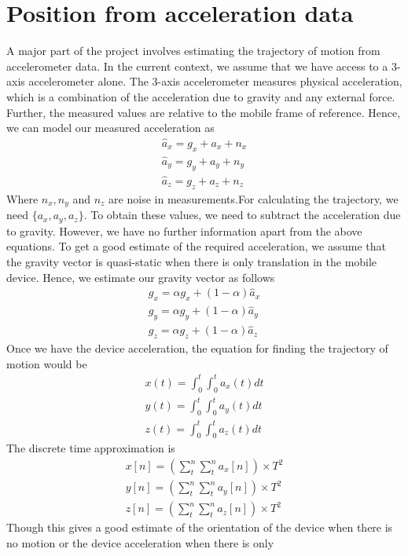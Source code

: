 \documentclass[BTech]{iitmdiss}
\begin{document}
\section{Position from acceleration data}
\label{basic_theory:accel}
A major part of the project involves estimating the trajectory of motion
from accelerometer data. In the current context, we assume that we have
access to a 3-axis accelerometer alone. The 3-axis accelerometer 
measures physical acceleration, which is a combination of the 
acceleration due to gravity and any external force. Further, the 
measured values are relative to the mobile frame of reference. Hence, 
we can model our measured acceleration as
\begin{align*}
\hat{a}_x= g_x + a_x + n_x\\
\hat{a}_y= g_y + a_y + n_y\\
\hat{a}_z= g_z + a_z + n_z
\end{align*}
Where $n_x, n_y$ and $n_z$ are noise in measurements.For calculating
 the trajectory, we need $\{a_x,a_y,a_z\}$. To obtain 
these values, we need to subtract the acceleration due to gravity. 
However, we have no further information apart from the above equations.
To get a good estimate of the required acceleration, we assume that the
gravity vector is quasi-static when there is only translation in the 
mobile device. Hence, we estimate our gravity vector as follows
\begin{align*}
g_x= \alpha{g_x} + (1-\alpha)\hat{a}_x\\
g_y= \alpha{g_y} + (1-\alpha)\hat{a}_y\\
g_z= \alpha{g_z} + (1-\alpha)\hat{a}_z
\end{align*}
Once we have the device acceleration, the equation for finding the 
trajectory of motion would be
\begin{align*}
x(t)=\int_0^{t}\int_0^{t}{a_x(t)dt}\\
y(t)=\int_0^{t}\int_0^{t}{a_y(t)dt}\\
z(t)=\int_0^{t}\int_0^{t}{a_z(t)dt}
\end{align*}
The discrete time approximation is
\begin{align*}
x[n]=({\sum}_{t}^{n}{\sum}_{t}^{n}a_x[n]){\times}T^2\\
y[n]=({\sum}_{t}^{n}{\sum}_{t}^{n}a_y[n]){\times}T^2\\
z[n]=({\sum}_{t}^{n}{\sum}_{t}^{n}a_z[n]){\times}T^2
\end{align*}
Though this gives a good estimate of the orientation of the device when
there is no motion or the device acceleration when there is only
\end{document}
